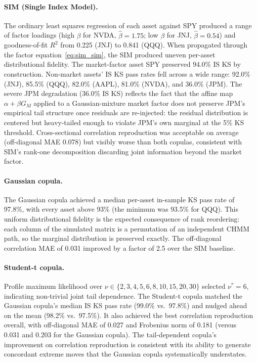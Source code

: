 \paragraph{SIM (Single Index Model).}
The ordinary least squares regression of each asset against SPY produced a range of factor loadings (high $\beta$ for NVDA, $\hat{\beta} = 1.75$; low $\beta$ for JNJ, $\hat{\beta} = 0.54$) and goodness-of-fit $R^2$ from 0.225 (JNJ) to 0.841 (QQQ).
When propagated through the factor equation~\eqref{eq:sim_sim}, the SIM produced uneven per-asset distributional fidelity.
The market-factor asset SPY preserved 94.0\% IS KS by construction.
Non-market assets' IS KS pass rates fell across a wide range: 92.0\% (JNJ), 85.5\% (QQQ), 82.0\% (AAPL), 81.0\% (NVDA), and 36.0\% (JPM).
The severe JPM degradation (36.0\% IS KS) reflects the fact that the affine map $\alpha + \beta G_M$ applied to a Gaussian-mixture market factor does not preserve JPM's empirical tail structure once residuals are re-injected: the residual distribution is centered but heavy-tailed enough to violate JPM's own marginal at the 5\% KS threshold.
Cross-sectional correlation reproduction was acceptable on average (off-diagonal MAE 0.078) but visibly worse than both copulas, consistent with SIM's rank-one decomposition discarding joint information beyond the market factor.

\paragraph{Gaussian copula.}
The Gaussian copula achieved a median per-asset in-sample KS pass rate of 97.8\%, with every asset above 93\% (the minimum was 93.5\% for QQQ).
This uniform distributional fidelity is the expected consequence of rank reordering: each column of the simulated matrix is a permutation of an independent CHMM path, so the marginal distribution is preserved exactly.
The off-diagonal correlation MAE of 0.031 improved by a factor of 2.5 over the SIM baseline.

\paragraph{Student-t copula.}
Profile maximum likelihood over $\nu \in \{2, 3, 4, 5, 6, 8, 10, 15, 20, 30\}$ selected $\nu^* = 6$, indicating non-trivial joint tail dependence.
The Student-t copula matched the Gaussian copula's median IS KS pass rate (99.0\% vs.\ 97.8\%) and nudged ahead on the mean (98.2\% vs.\ 97.5\%).
It also achieved the best correlation reproduction overall, with off-diagonal MAE of 0.027 and Frobenius norm of 0.181 (versus 0.031 and 0.203 for the Gaussian copula).
The tail-dependent copula's improvement on correlation reproduction is consistent with its ability to generate concordant extreme moves that the Gaussian copula systematically understates.


